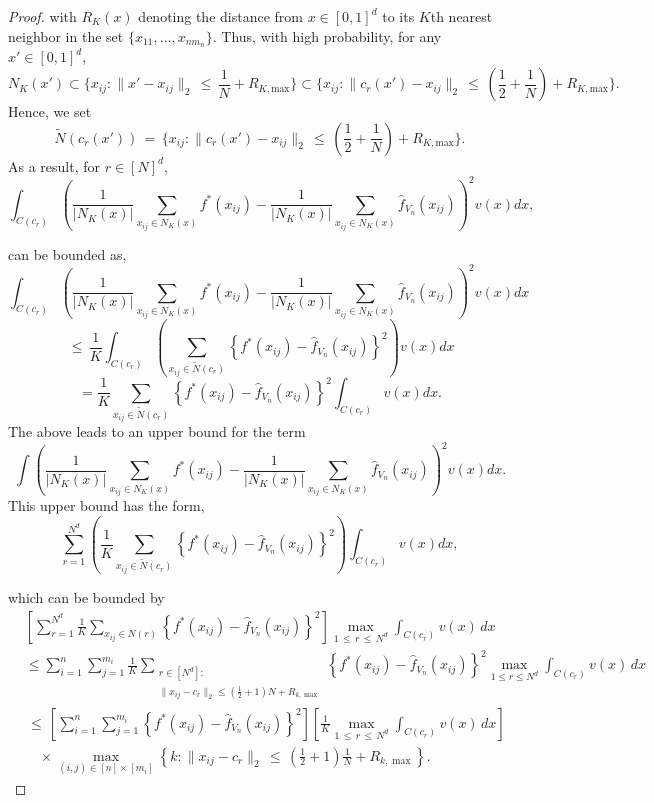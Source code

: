 \documentclass[twoside,11pt]{article}
\begin{document}
\begin{proof}
with \(R_K(x)\) denoting the distance from \(x \in [0, 1]^d\) to its \(K\)th nearest neighbor in the set \(\{x_{11}, \ldots, x_{nm_n}\}\). Thus, with high probability, for any \(x' \in [0, 1]^d\),
\[
N_K(x') \subset \{x_{ij} : \|x' - x_{ij}\|_2 \,\leq\, \frac{1}{N} + R_{K,\text{max}}\} 
\subset \{x_{ij} : \|c_r(x') - x_{ij}\|_2 \,\leq\, \left(\frac{1}{2} + \frac{1}{N}\right) + R_{K,\text{max}}\}.
\]
Hence, we set
\[
\tilde N(c_r(x')) \,=\, \{x_{ij} : \|c_r(x') - x_{ij}\|_2 \,\leq\, \left(\frac{1}{2} + \frac{1}{N}\right) + R_{K,\text{max}}\}.
\]
As a result, for \(r \in [N]^d\),
\[
\int_{C(c_r)} \left( \frac{1}{{|N_K(x)|}} \sum_{x_{ij} \in N_K(x)} f^*(x_{ij}) - \frac{1}{{|N_K(x)|}} \sum_{x_{ij} \in N_K(x)} \hat{f}_{V_n}(x_{ij}) \right)^2 v(x)dx,
\]

can be bounded as,
\[
\int_{C(c_r)} \left( \frac{1}{{|N_K(x)|}} \sum_{x_{ij} \in N_K(x)} f^*(x_{ij}) - \frac{1}{{|N_K(x)|}} \sum_{x_{ij} \in N_K(x)} \hat{f}_{V_n}(x_{ij}) \right)^2 v(x)dx
\]
\[
\,\leq\, \frac{1}{K} \int_{C(c_r)} \left( \sum_{x_{ij} \in \tilde N(c_r)} \left\{ f^*(x_{ij}) - \hat{f}_{V_n}(x_{ij}) \right\}^2 \right) v(x)dx
\]
\[
= \frac{1}{K} \sum_{x_{ij} \in \tilde N(c_r)} \left\{ f^*(x_{ij}) - \hat{f}_{V_n}(x_{ij}) \right\}^2 \int_{C(c_r)} v(x)dx.
\]
The above leads to an upper bound for the term
\[
\int \left( \frac{1}{{|N_K(x)|}} \sum_{x_{ij} \in N_K(x)} f^*(x_{ij}) - \frac{1}{{|N_K(x)|}} \sum_{x_{ij} \in N_K(x)} \hat{f}_{V_n}(x_{ij}) \right)^2 v(x)dx.
\]
This upper bound has the form,
\[
\sum_{r=1}^{N^d} \left( \frac{1}{K} \sum_{x_{ij} \in \tilde N(c_r)} \left\{ f^*(x_{ij}) - \hat{f}_{V_n}(x_{ij}) \right\}^2 \right) \int_{C(c_r)} v(x)dx,
\]

which can be bounded by
\begin{align*}
&\left[ \sum_{r=1}^{N^d} \frac{1}{K} \sum_{x_{ij} \in N(r)} \left\{ f^*(x_{ij}) - \hat{f}_{V_n}(x_{ij}) \right\}^2 \right] \max_{1 \,\leq\, r \,\leq\, N^d} \int_{C(c_r)} v(x) \, dx \\
&\leq \sum_{i=1}^{n} \sum_{j=1}^{m_i} \frac{1}{K} \sum_{\substack{r \in [N^d] : \\ \|x_{ij} - c_r\|_2 \leq (\frac{1}{2}+1)N + R_{k,\max}}} \left\{ f^*(x_{ij}) - \hat{f}_{V_n}(x_{ij}) \right\}^2 \max_{1 \leq r \leq N^d} \int_{C(c_r)} v(x) \, dx \\
&\,\leq\, \left[\sum_{i=1}^{n} \sum_{j=1}^{m_i} \left\{ f^*(x_{ij}) - \hat{f}_{V_n}(x_{ij}) \right\}^2 \right]\left[ \frac{1}{K} \max_{1 \,\leq\, r \,\leq\, N^d} \int_{C(c_r)} v(x) \, dx \right] \\
&\quad \times \max_{(i,j) \in [n] \times [m_i]} \left\{ k : \|x_{ij} - c_r\|_2 \,\leq\, \left( \frac{1}{2} + 1 \right) \frac{1}{N} + R_{k,\max} \right\}.
\end{align*}


\end{proof}
\end{document}
